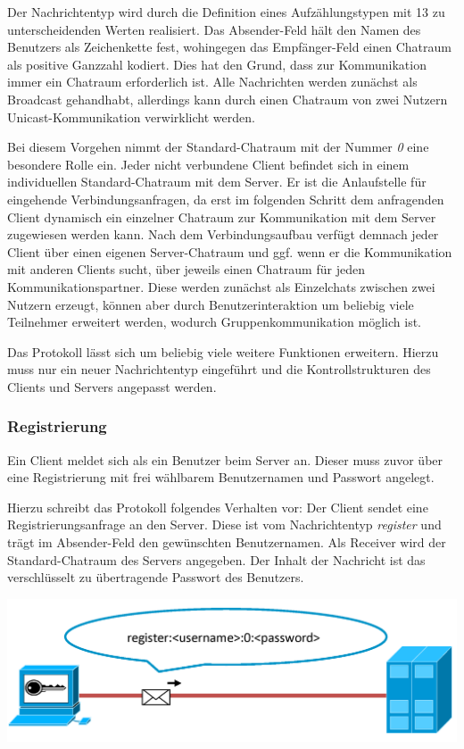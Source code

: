 \documentclass[12pt,a4paper,bibliography=totocnumbered,listof=totocnumbered]{scrartcl}
\begin{document}
Der Nachrichtentyp wird durch die Definition eines Aufzählungstypen mit 13 zu unterscheidenden Werten realisiert. Das Absender-Feld hält den Namen des Benutzers als Zeichenkette fest, wohingegen das Empfänger-Feld einen Chatraum als positive Ganzzahl kodiert. Dies hat den Grund, dass zur Kommunikation immer ein Chatraum erforderlich ist. Alle Nachrichten werden zunächst als Broadcast gehandhabt, allerdings kann durch einen Chatraum von zwei Nutzern Unicast-Kommunikation verwirklicht werden. 

Bei diesem Vorgehen nimmt der Standard-Chatraum mit der Nummer \textit{0} eine besondere Rolle ein. Jeder nicht verbundene Client befindet sich in einem individuellen Standard-Chatraum mit dem Server. Er ist die Anlaufstelle für eingehende Verbindungsanfragen, da erst im folgenden Schritt dem anfragenden Client dynamisch ein einzelner Chatraum zur Kommunikation mit dem Server zugewiesen werden kann. Nach dem Verbindungsaufbau verfügt demnach jeder Client über einen eigenen Server-Chatraum und ggf. wenn er die Kommunikation mit anderen Clients sucht, über jeweils einen Chatraum für jeden Kommunikationspartner. Diese werden zunächst als Einzelchats zwischen zwei Nutzern erzeugt, können aber durch Benutzerinteraktion um beliebig viele Teilnehmer erweitert werden, wodurch Gruppenkommunikation möglich ist.

Das Protokoll lässt sich um beliebig viele weitere Funktionen erweitern. Hierzu muss nur ein neuer Nachrichtentyp eingeführt und die Kontrollstrukturen des Clients und Servers angepasst werden.

\subsubsection{Registrierung}
Ein Client meldet sich als ein Benutzer beim Server an. Dieser muss zuvor über eine Registrierung mit frei wählbarem Benutzernamen und Passwort angelegt.

Hierzu schreibt das Protokoll folgendes Verhalten vor: 
Der Client sendet eine Registrierungsanfrage an den Server. Diese ist vom Nachrichtentyp \textit{register} und trägt im Absender-Feld den gewünschten Benutzernamen. Als Receiver wird der Standard-Chatraum des Servers angegeben. Der Inhalt der Nachricht ist das verschlüsselt zu übertragende Passwort des Benutzers.

\vspace{1em}
\begin{minipage}{\linewidth}
	\centering
	\includegraphics[width=0.7\linewidth]{img/register1.png}
	\label{fig:Registrierung1}
\end{minipage}
\vspace{0.5em}
\end{document}
